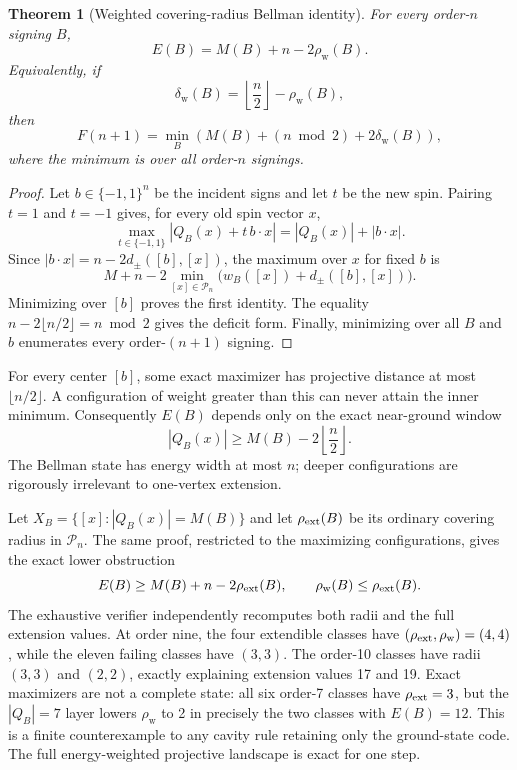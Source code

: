 \documentclass[11pt]{article}
\newtheorem{theorem}{Theorem}
\newcommand{\eps}{\{-1,1\}}
\begin{document}
\begin{theorem}[Weighted covering-radius Bellman identity]
\label{thm:weighted-bellman}
For every order-$n$ signing $B$,
\[
 E(B)=M(B)+n-2\rho_{\mathrm w}(B).
\]
Equivalently, if
\[
 \delta_{\mathrm w}(B)=\left\lfloor\frac n2\right\rfloor
 -\rho_{\mathrm w}(B),
\]
then
\[
 F(n+1)=\min_B\left(
 M(B)+(n\bmod2)+2\delta_{\mathrm w}(B)
 \right),
\]
where the minimum is over all order-$n$ signings.
\end{theorem}

\begin{proof}
Let $b\in\eps^n$ be the incident signs and let $t$ be the new spin.  Pairing
$t=1$ and $t=-1$ gives, for every old spin vector $x$,
\[
 \max_{t\in\eps}|Q_B(x)+t\,b\mathbin\cdot x|
 =|Q_B(x)|+|b\mathbin\cdot x|.
\]
Since $|b\mathbin\cdot x|=n-2d_\pm([b],[x])$, the maximum over $x$ for
fixed $b$ is
\[
 M+n-2\min_{[x]\in\mathcal P_n}
 \bigl(w_B([x])+d_\pm([b],[x])\bigr).
\]
Minimizing over $[b]$ proves the first identity.  The equality
$n-2\lfloor n/2\rfloor=n\bmod2$ gives the deficit form.  Finally,
minimizing over all $B$ and $b$ enumerates every order-$(n+1)$ signing.
\end{proof}

For every center $[b]$, some exact maximizer has projective distance at most
$\lfloor n/2\rfloor$.  A configuration of weight greater than this can never
attain the inner minimum.  Consequently $E(B)$ depends only on the exact
near-ground window
\[
 |Q_B(x)|\ge M(B)-2\left\lfloor\frac n2\right\rfloor.
\]
The Bellman state has energy width at most $n$; deeper configurations are
rigorously irrelevant to one-vertex extension.

Let $X_B=\{[x]:|Q_B(x)|=M(B)\}$ and let $\rho_{\rm ext}(B)$ be its
ordinary covering radius in $\mathcal P_n$.  The same proof, restricted to
the maximizing configurations, gives the exact lower obstruction
\[
 E(B)\ge M(B)+n-2\rho_{\rm ext}(B),
 \qquad \rho_{\mathrm w}(B)\le\rho_{\rm ext}(B).
\]
The exhaustive verifier independently recomputes both radii and the full
extension values.  At order nine, the four extendible classes have
$(\rho_{\rm ext},\rho_{\mathrm w})=(4,4)$, while the eleven failing classes
have $(3,3)$.  The order-10 classes have radii $(3,3)$ and $(2,2)$, exactly
explaining extension values 17 and 19.  Exact maximizers are not a complete
state: all six order-7 classes have $\rho_{\rm ext}=3$, but the $|Q_B|=7$
layer lowers $\rho_{\mathrm w}$ to 2 in precisely the two classes with
$E(B)=12$.  This is a finite counterexample to any cavity rule retaining only
the ground-state code.  The full energy-weighted projective landscape is
exact for one step.
\end{document}
